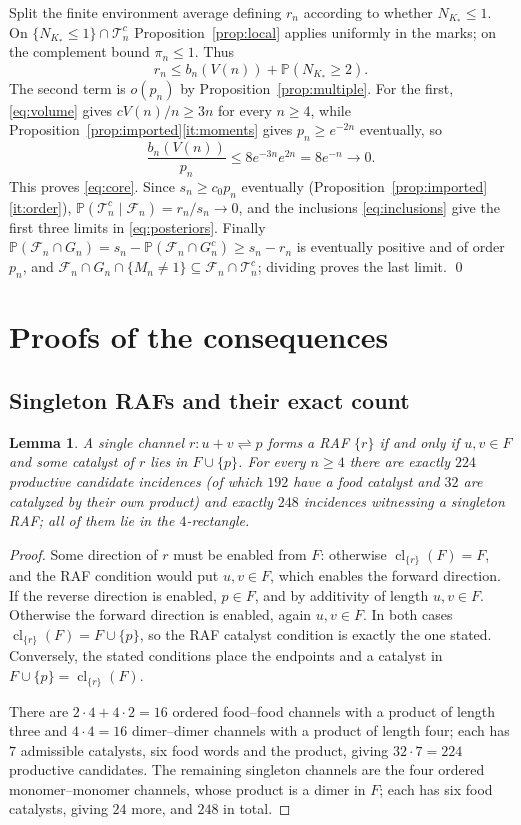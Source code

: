 \documentclass[11pt,letterpaper]{article}
\theoremstyle{plain}
\newtheorem{lemma}[theorem]{Lemma}
\theoremstyle{definition}
\theoremstyle{remark}
\numberwithin{equation}{section}
\newcommand{\PP}{\mathbb P}
\newcommand{\cF}{\mathcal F}
\newcommand{\cT}{\mathcal T}
\newcommand{\cl}{\operatorname{cl}}
\begin{document}
Split the finite environment average defining $r_n$ according to whether $N_{K_*}\le1$. On $\{N_{K_*}\le1\}\cap\cT_n^c$ Proposition~\ref{prop:local} applies uniformly in the marks; on the complement bound $\pi_n\le1$. Thus
\begin{equation}\label{eq:average}
 r_n\le b_n(V(n))+\PP(N_{K_*}\ge2) .
\end{equation}
The second term is $o(p_n)$ by Proposition~\ref{prop:multiple}. For the first, \eqref{eq:volume} gives $cV(n)/n\ge3n$ for every $n\ge4$, while Proposition~\ref{prop:imported}\ref{it:moments} gives $p_n\ge e^{-2n}$ eventually, so
\[
 \frac{b_n(V(n))}{p_n}\le8e^{-3n}e^{2n}=8e^{-n}\longrightarrow0 .
\]
This proves \eqref{eq:core}. Since $s_n\ge c_0p_n$ eventually (Proposition~\ref{prop:imported}\ref{it:order}), $\PP(\cT_n^c\mid\cF_n)=r_n/s_n\to0$, and the inclusions \eqref{eq:inclusions} give the first three limits in \eqref{eq:posteriors}. Finally $\PP(\cF_n\cap G_n)=s_n-\PP(\cF_n\cap G_n^c)\ge s_n-r_n$ is eventually positive and of order $p_n$, and $\cF_n\cap G_n\cap\{M_n\ne1\}\subseteq\cF_n\cap\cT_n^c$; dividing proves the last limit. \qed

\section{Proofs of the consequences}\label{sec:consequences}

\subsection{Singleton RAFs and their exact count}
\begin{lemma}\label{lem:singleton}
A single channel $r:u+v\rightleftharpoons p$ forms a RAF $\{r\}$ if and only if $u,v\in F$ and some catalyst of $r$ lies in $F\cup\{p\}$. For every $n\ge4$ there are exactly $224$ productive candidate incidences (of which $192$ have a food catalyst and $32$ are catalyzed by their own product) and exactly $248$ incidences witnessing a singleton RAF; all of them lie in the $4$-rectangle.
\end{lemma}
\begin{proof}
Some direction of $r$ must be enabled from $F$: otherwise $\cl_{\{r\}}(F)=F$, and the RAF condition would put $u,v\in F$, which enables the forward direction. If the reverse direction is enabled, $p\in F$, and by additivity of length $u,v\in F$. Otherwise the forward direction is enabled, again $u,v\in F$. In both cases $\cl_{\{r\}}(F)=F\cup\{p\}$, so the RAF catalyst condition is exactly the one stated. Conversely, the stated conditions place the endpoints and a catalyst in $F\cup\{p\}=\cl_{\{r\}}(F)$.

There are $2\cdot4+4\cdot2=16$ ordered food--food channels with a product of length three and $4\cdot4=16$ dimer--dimer channels with a product of length four; each has $7$ admissible catalysts, six food words and the product, giving $32\cdot7=224$ productive candidates. The remaining singleton channels are the four ordered monomer--monomer channels, whose product is a dimer in $F$; each has six food catalysts, giving $24$ more, and $248$ in total.
\end{proof}
\end{document}
